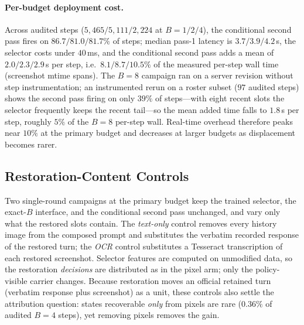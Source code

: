 \documentclass[letterpaper]{article} %
\begin{document}
\paragraph{Per-budget deployment cost.}
Across audited steps ($5{,}465/5{,}111/2{,}224$ at $B{=}1/2/4$), the
conditional second pass fires on $86.7/81.0/81.7\%$ of steps; median
pass-1 latency is $3.7/3.9/4.2$\,s, the selector costs under $40$\,ms, and
the conditional second pass adds a mean of $2.0/2.3/2.9$\,s per step,
i.e.\ $8.1/8.7/10.5\%$ of the measured per-step wall time (screenshot
mtime spans). The $B{=}8$ campaign ran on a server revision without step
instrumentation; an instrumented rerun on a roster subset ($97$ audited
steps) shows the second pass firing on only $39\%$ of steps---with eight
recent slots the selector frequently keeps the recent tail---so the mean
added time falls to $1.8$\,s per step, roughly $5\%$ of the $B{=}8$
per-step wall. Real-time overhead therefore peaks near $10\%$ at the
primary budget and decreases at larger budgets as displacement becomes
rarer.

\subsection{Restoration-Content Controls}

Two single-round campaigns at the primary budget keep the trained
selector, the exact-$B$ interface, and the conditional second pass
unchanged, and vary only what the restored slots contain. The
\emph{text-only} control removes every history image from the composed
prompt and substitutes the verbatim recorded response of the restored
turn; the \emph{OCR} control substitutes a Tesseract transcription of
each restored screenshot. Selector features are computed on unmodified
data, so the restoration \emph{decisions} are distributed as in the pixel
arm; only the policy-visible carrier changes. Because restoration moves an
official retained turn (verbatim response plus screenshot) as a unit,
these controls also settle the attribution question: states recoverable
\emph{only} from pixels are rare ($0.36\%$ of audited $B{=}4$ steps), yet
removing pixels removes the gain.
\end{document}
